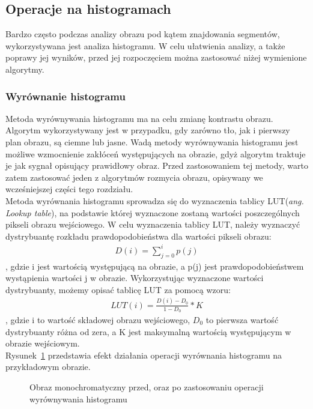 \subsection{Operacje na histogramach}
Bardzo często podczas analizy obrazu pod kątem znajdowania segmentów, wykorzystywana jest analiza histogramu. W celu ułatwienia analizy, a także poprawy jej wyników, przed jej rozpoczęciem można zastosować niżej wymienione algorytmy.
\subsubsection{Wyrównanie histogramu}
Metoda wyrównywania histogramu ma na celu zmianę kontrastu obrazu. Algorytm wykorzystywany jest w przypadku, gdy zarówno tło, jak i pierwszy plan obrazu, są ciemne lub jasne. Wadą metody wyrównywania histogramu jest możliwe wzmocnienie zakłóceń występujących na obrazie, gdyż algorytm traktuje je jak sygnał opisujący prawidłowy obraz. Przed zastosowaniem tej metody, warto zatem zastosować jeden z algorytmów rozmycia obrazu, opisywany we wcześniejszej części tego rozdziału.\\
Metoda wyrównania histogramu sprowadza się do wyznaczenia tablicy LUT(\textit{ang. Lookup table}), na podstawie której wyznaczone zostaną wartości poszczególnych pikseli obrazu wejściowego. W celu wyznaczenia tablicy LUT, należy wyznaczyć dystrybuantę rozkładu prawdopodobieństwa dla wartości pikseli obrazu:
\begin{gather*}
  D(i) = \sum\limits_{j=0}^i p(j)
\end{gather*}, gdzie i jest wartością występującą na obrazie, a p(j) jest prawdopodobieństwem wystąpienia wartości j w obrazie. Wykorzystując wyznaczone wartości dystrybuanty, możemy opisać tablicę LUT za pomocą wzoru:
\begin{gather*}
  LUT(i) = \frac{D(i)-D_0}{1-D_0}*K
\end{gather*}, gdzie i to wartość składowej obrazu wejściowego, $D_0$ to pierwsza wartość dystrybuanty różna od zera, a K jest maksymalną wartością występującym w obrazie wejściowym.\\
Rysunek~\ref{fig:equalizehistogram} przedstawia efekt działania operacji wyrównania histogramu na przykładowym obrazie.
\begin{figure}
  \centering
  \caption{Obraz monochromatyczny przed, oraz po zastosowaniu operacji wyrównywania histogramu}
  \label{fig:equalizehistogram}
\end{figure}


